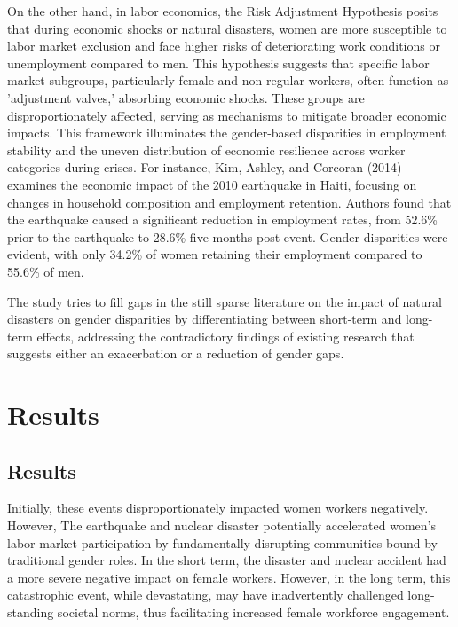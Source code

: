 \documentclass[12pt,halfline,a4paper]{ouparticle}
\begin{document}
On the other hand, in labor economics, the Risk Adjustment Hypothesis posits that during economic shocks or natural disasters, women are more susceptible to labor market exclusion and face higher risks of deteriorating work conditions or unemployment compared to men. This hypothesis suggests that specific labor market subgroups, particularly female and non-regular workers, often function as 'adjustment valves,' absorbing economic shocks. These groups are disproportionately affected, serving as mechanisms to mitigate broader economic impacts. This framework illuminates the gender-based disparities in employment stability and the uneven distribution of economic resilience across worker categories during crises. For instance, Kim, Ashley, and Corcoran (2014) examines the economic impact of the 2010 earthquake in Haiti, focusing on changes in household composition and employment retention. Authors found that the earthquake caused a significant reduction in employment rates, from 52.6\% prior to the earthquake to 28.6\% five months post-event. Gender disparities were evident, with only 34.2\% of women retaining their employment compared to 55.6\% of men. 


The study tries to fill gaps in the still sparse literature on the impact of natural disasters on gender disparities by differentiating between short-term and long-term effects, addressing the contradictory findings of existing research that suggests either an exacerbation or a reduction of gender gaps.


\section{Results}
\label{sec5}

\subsection{Results}
\label{sec5.1}


Initially, these events disproportionately impacted women workers negatively. However, The earthquake and nuclear disaster potentially accelerated women's labor market participation by fundamentally disrupting communities bound by traditional gender roles. In the short term, the disaster and nuclear accident had a more severe negative impact on female workers. However, in the long term, this catastrophic event, while devastating, may have inadvertently challenged long-standing societal norms, thus facilitating increased female workforce engagement.


\nocite{*}

\end{document}
